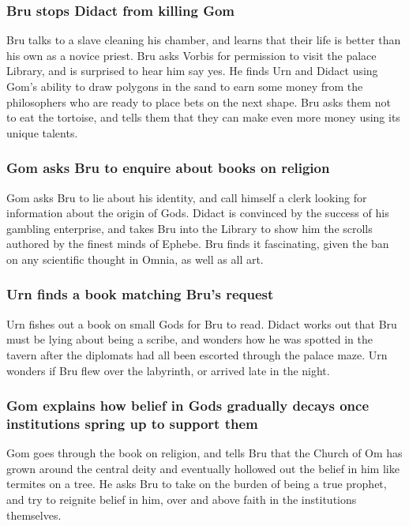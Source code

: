 \subsubsection{\Gls{Bru} stops \Gls{Didact} from killing \Gls{Gom}}
\Gls{Bru} talks to a slave cleaning his chamber, and learns that their life is better than his own
as a novice priest. \Gls{Bru} asks \Gls{Vorbis} for permission to visit the palace Library, and
is surprised to hear him say yes. He finds \Gls{Urn} and \Gls{Didact} using \Gls{Gom}'s ability to
draw polygons in the sand to earn some money from the philosophers who are ready to place bets on
the next shape. \Gls{Bru} asks them not to eat the tortoise, and tells them that they can make even
more money using its unique talents.

\subsubsection{\Gls{Gom} asks \Gls{Bru} to enquire about books on religion}
\Gls{Gom} asks \Gls{Bru} to lie about his identity, and call himself a clerk looking for information
about the origin of Gods. \Gls{Didact} is convinced by the success of his gambling enterprise, and
takes \Gls{Bru} into the Library to show him the scrolls authored by the finest minds of Ephebe.
\Gls{Bru} finds it fascinating, given the ban on any scientific thought in Omnia, as well as all
art.

\subsubsection{\Gls{Urn} finds a book matching \Gls{Bru}'s request}
\Gls{Urn} fishes out a book on small Gods for \Gls{Bru} to read. \Gls{Didact} works out that
\Gls{Bru} must be lying about being a scribe, and wonders how he was spotted in the tavern after
the diplomats had all been escorted through the palace maze. \Gls{Urn} wonders if \Gls{Bru} flew
over the labyrinth, or arrived late in the night.

\subsubsection{\Gls{Gom} explains how belief in Gods gradually decays once institutions spring up
    to support them}
\Gls{Gom} goes through the book on religion, and tells \Gls{Bru} that the Church of Om has grown
around the central deity and eventually hollowed out the belief in him like termites on a tree.
He asks \Gls{Bru} to take on the burden of being a true prophet, and try to reignite belief in
him, over and above faith in the institutions themselves.


